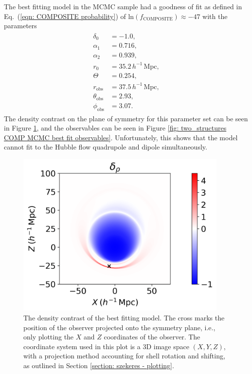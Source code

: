 \documentclass[a4paper,12pt]{report}
\renewcommand{\eqref}[1]{Eq.~({#1})}
\begin{document}
The best fitting model in the MCMC sample had a goodness of fit as defined in \eqref{\ref{eqn: COMPOSITE probability}} of $\text{ln}(f_\text{COMPOSITE})\approx -47$ with the parameters
\begin{align}
    \begin{split} \label{eqn: two_structures best composite fit}
        \delta_0 &= -1.0, \\
        \alpha_1 &= 0.716, \\
        \alpha_2 &= 0.939, \\
        r_0 &= 35.2\, h^{-1}\, \text{Mpc}, \\
        \Theta &= 0.254, \\
        r_\text{obs} &= 37.5\, h^{-1}\, \text{Mpc}, \\
        \theta_\text{obs} &= 2.93, \\
        \phi_\text{obs} &= 3.07.
    \end{split}
\end{align}
The density contrast on the plane of symmetry for this parameter set can be seen in Figure \ref{fig: two_structures model best fit density contrast}, and the observables can be seen in Figure \ref{fig: two_structures COMP MCMC best fit observables}. Unfortunately, this shows that the model cannot fit to the Hubble flow quadrupole and dipole simultaneously.
\begin{figure}[!t]
    \centering
    \includegraphics[width=105mm]{two structures/COMP only MCMC/Best Fit/density contrast.png}
    \caption{The density contrast of the best fitting model. The cross marks the position of the observer projected onto the symmetry plane, i.e., only plotting the $X$ and $Z$ coordinates of the observer. The coordinate system used in this plot is a 3D image space $(X,Y,Z)$, with a projection method accounting for shell rotation and shifting, as outlined in Section \ref{section: szekeres - plotting}.}
    \label{fig: two_structures model best fit density contrast}
\end{figure}
\end{document}
